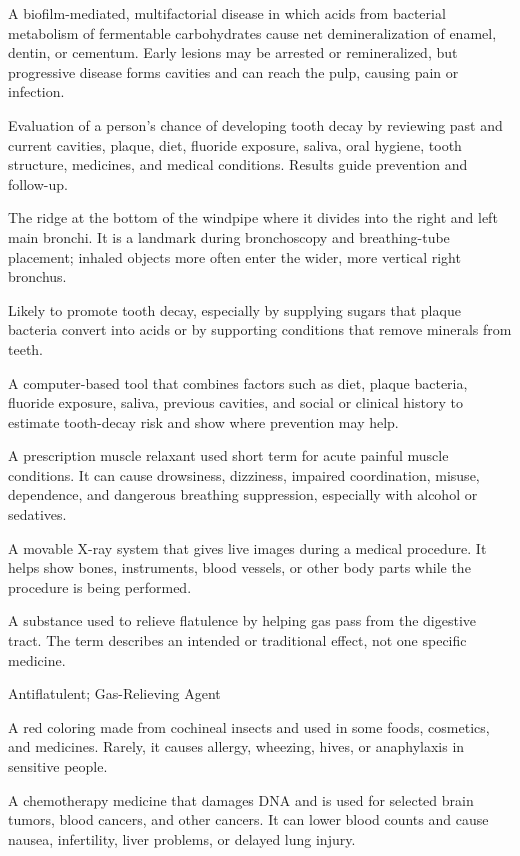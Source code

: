 A biofilm-mediated, multifactorial disease in which acids from bacterial metabolism of fermentable carbohydrates cause net demineralization of enamel, dentin, or cementum. Early lesions may be arrested or remineralized, but progressive disease forms cavities and can reach the pulp, causing pain or infection.

 Evaluation of a person's chance of developing tooth decay by reviewing past and current cavities, plaque, diet, fluoride exposure, saliva, oral hygiene, tooth structure, medicines, and medical conditions. Results guide prevention and follow-up.

 The ridge at the bottom of the windpipe where it divides into the right and left main bronchi. It is a landmark during bronchoscopy and breathing-tube placement; inhaled objects more often enter the wider, more vertical right bronchus.

 Likely to promote tooth decay, especially by supplying sugars that plaque bacteria convert into acids or by supporting conditions that remove minerals from teeth.

 A computer-based tool that combines factors such as diet, plaque bacteria, fluoride exposure, saliva, previous cavities, and social or clinical history to estimate tooth-decay risk and show where prevention may help.

 A prescription muscle relaxant used short term for acute painful muscle conditions. It can cause drowsiness, dizziness, impaired coordination, misuse, dependence, and dangerous breathing suppression, especially with alcohol or sedatives.

 A movable X-ray system that gives live images during a medical procedure. It helps show bones, instruments, blood vessels, or other body parts while the procedure is being performed.

 A substance used to relieve flatulence by helping gas pass from the digestive tract. The term describes an intended or traditional effect, not one specific medicine.

\synonyms
Antiflatulent; Gas-Relieving Agent

 A red coloring made from cochineal insects and used in some foods, cosmetics, and medicines. Rarely, it causes allergy, wheezing, hives, or anaphylaxis in sensitive people.

 A chemotherapy medicine that damages DNA and is used for selected brain tumors, blood cancers, and other cancers. It can lower blood counts and cause nausea, infertility, liver problems, or delayed lung injury.

